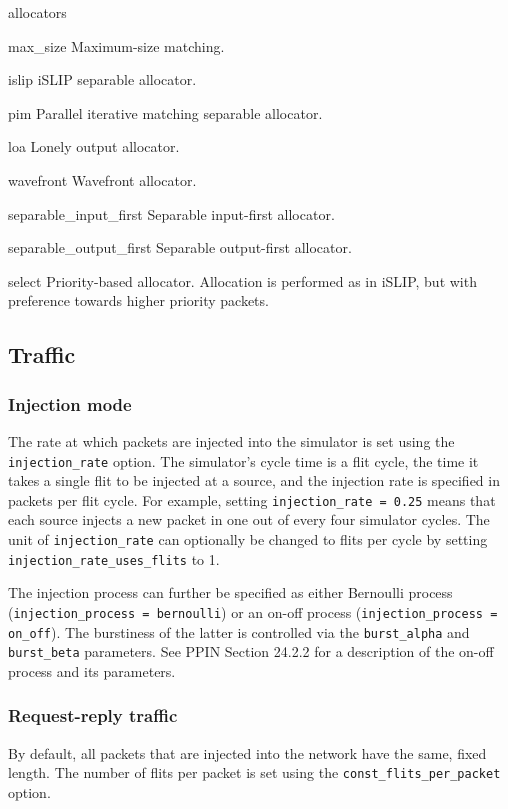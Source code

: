 \documentclass[11pt]{article}
\begin{document}
{\begin{opt_list}{allocators}

\item[max\_size] Maximum-size matching. 
\item[islip] iSLIP separable allocator.
\item[pim] Parallel iterative matching separable allocator.
\item[loa] Lonely output allocator.
\item[wavefront] Wavefront allocator.
\item[separable\_input\_first] Separable input-first allocator.
\item[separable\_output\_first] Separable output-first allocator.
\item[select] Priority-based allocator.  Allocation is performed as in
iSLIP, but with preference towards higher priority packets.

\end{opt_list}

\subsection{Traffic}
\label{sec:traffic}


\subsubsection{Injection mode}
The rate at which packets are injected into the simulator is set using
the \texttt{injection\_rate} option.  The simulator's cycle time is a
flit cycle, the time it takes a single flit to be injected at a
source, and the injection rate is specified in packets per flit cycle.
For example, setting \texttt{injection\_rate = 0.25} means that each
source injects a new packet in one out of every four simulator cycles.
The unit of \texttt{injection\_rate} can optionally be changed to flits per cycle by 
setting \texttt{injection\_rate\_uses\_flits} to 1.

The injection process can further be specified as either Bernoulli process 
(\texttt{injection\_process = bernoulli}) or an on-off process
(\texttt{injection\_process = on\_off}).  The burstiness of the latter
is controlled via the \texttt{burst\_alpha} and
\texttt{burst\_beta} parameters.  See PPIN Section 24.2.2 for a
description of the on-off process and its parameters.

\subsubsection{Request-reply traffic}
By default, all packets that are injected into the network have the same, 
fixed length. The number of flits per packet is set using the
\texttt{const\_flits\_per\_packet} option. 

}
\end{document}
